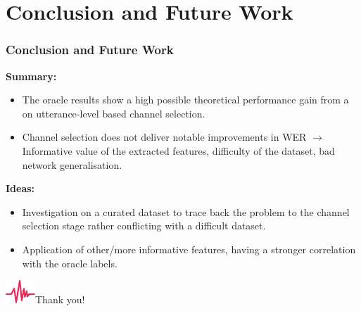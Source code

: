\documentclass{beamer}
\begin{document}
\section{Conclusion and Future Work}
\begin{frame}
  \frametitle{Conclusion and Future Work}
  
  \textbf{Summary:}

  \begin{itemize} 
    \item The oracle results show a high possible theoretical performance gain from a on utterance-level based channel selection.
    \item Channel selection does not deliver notable improvements in WER \textcolor{tug_red}{$\rightarrow$ Informative value of the extracted features, difficulty of the dataset, bad network generalisation}. 
  \end{itemize}
  
  \textbf{Ideas:}
  \begin{itemize}
    \item Investigation on a curated dataset to trace back the problem to the channel selection stage rather conflicting with a difficult dataset.
    \item Application of other/more informative features, having a stronger correlation with the oracle labels. 
  \end{itemize}
  
\end{frame}

\begin{frame}[plain]
  \centering
  \vspace{1.5em}
  \includegraphics[width=3em]{img/speechwave}\Huge Thank you!
\end{frame}
\end{document}

